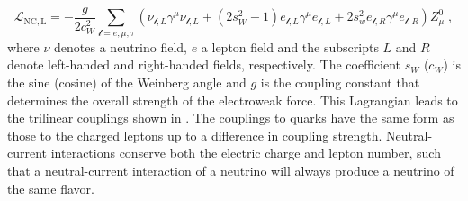 \begin{equation}
  \mathcal{L}_\mathrm{NC,L} = -\frac{g}{2 c_W^2} \sum_{\mathcal{l}=e,\mu,\tau} (\bar{\nu}_{\mathcal{l}, L} \gamma^\mu \nu_{\mathcal{l}, L} + (2 s_W^2 - 1) \bar{e}_{\mathcal{l}, L} \gamma^\mu e_{\mathcal{l}, L} + 2s_w^2 \bar{e}_{\mathcal{l}, R} \gamma^\mu e_{\mathcal{l}, R}) Z^0_\mu\;, \label{eq:ew-nc-lagrangian}
\end{equation}
where $\nu$ denotes a neutrino field, $e$ a lepton field and the subscripts $L$ and $R$ denote left-handed and right-handed fields, respectively. The coefficient $s_W$ ($c_W$) is the sine (cosine) of the Weinberg angle and $g$ is the coupling constant that determines the overall strength of the electroweak force. This Lagrangian leads to the trilinear couplings shown in . The couplings to quarks have the same form as those to the charged leptons up to a difference in coupling strength. Neutral-current interactions conserve both the electric charge and lepton number, such that a neutral-current interaction of a neutrino will always produce a neutrino of the same flavor.

